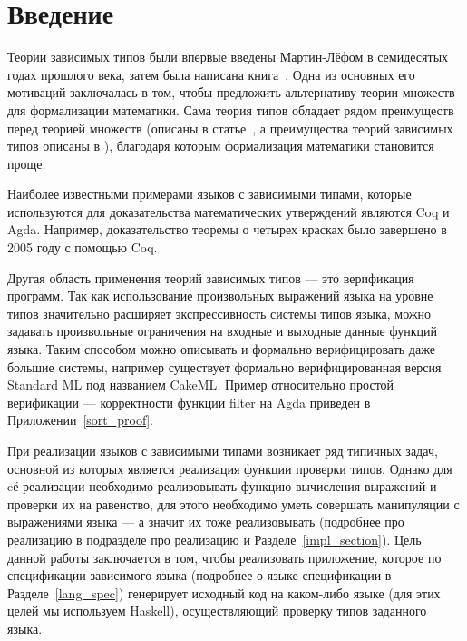 \section*{Введение}
Теории зависимых типов были впервые введены Мартин-Лёфом в семидесятых годах прошлого века\cite{early_lof}, затем была написана книга~\cite{martin_lof}. Одна из основных его мотиваций заключалась в том, чтобы предложить альтернативу теории множеств для формализации математики. Сама теория типов обладает рядом преимуществ перед теорией множеств (описаны в статье~\cite{farmer_seven}, а преимущества теорий зависимых типов описаны в \cite{shulman_homotopy}), благодаря которым формализация математики становится проще.


Наиболее известными примерами языков с зависимыми типами, которые используются для доказательства математических утверждений являются Coq\cite{coq} и Agda\cite{agda}. Например, доказательство теоремы о четырех красках было завершено в 2005 году с помощью Coq\cite{weisstein2002four}.

Другая область применения теорий зависимых типов --- это верификация программ. Так как использование произвольных выражений языка на уровне типов значительно расширяет экспрессивность системы типов языка, можно задавать произвольные ограничения на входные и выходные данные функций языка. Таким способом можно описывать и формально верифицировать даже большие системы, например существует формально верифицированная версия Standard ML\cite{ml_lang} под названием CakeML\cite{ml_cake}. Пример относительно простой верификации --- корректности функции filter на Agda приведен в Приложении~\ref{sort_proof}.

\hfill

При реализации языков с зависимыми типами возникает ряд типичных задач, основной из которых является реализация функции проверки типов. Однако для eё реализации необходимо реализовывать функцию вычисления выражений и проверки их на равенство, для этого необходимо уметь совершать манипуляции с выражениями языка --- а значит их тоже реализовывать (подробнее про реализацию в подразделе про реализацию и Разделе~\ref{impl_section}). Цель данной работы заключается в том, чтобы реализовать приложение, которое по спецификации зависимого языка (подробнее о языке спецификации в Разделе~\ref{lang_spec}) генерирует исходный код на каком-либо языке (для этих целей мы используем Haskell\cite{haskell}), осуществляющий проверку типов заданного языка.

